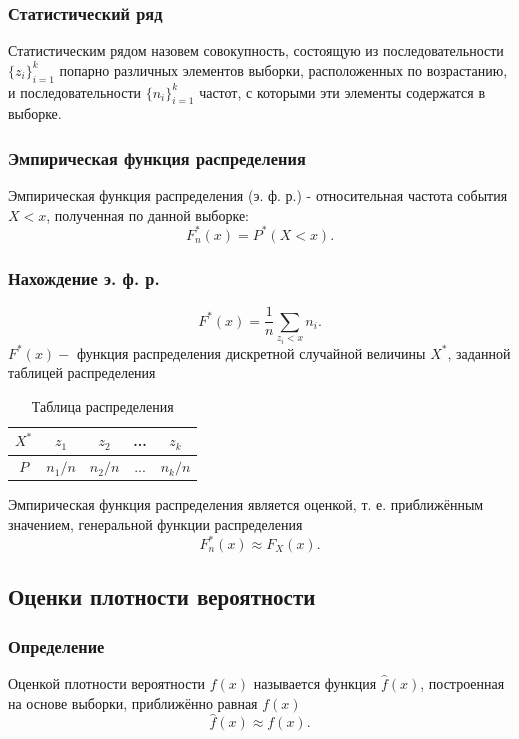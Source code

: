 \documentclass[a4paper]{article}
\begin{document}
\subsubsection{Статистический ряд}
Статистическим рядом назовем совокупность, состоящую из последовательности $\displaystyle\{z_i\}_{i=1}^k$ попарно различных элементов выборки, расположенных по возрастанию, и последовательности $\displaystyle\{n_i\}_{i=1}^k$ частот, с которыми эти элементы содержатся в выборке.
\subsubsection{Эмпирическая функция распределения}
Эмпирическая функция распределения (э. ф. р.) - относительная частота события $X < x$, полученная по данной выборке:
\begin{equation}
    F_n^*(x)=P^*(X<x).
\end{equation}
\subsubsection{Нахождение э. ф. р.}
\begin{equation}
    F^*(x)=\frac{1}{n}\sum_{z_i<x}n_i.
\end{equation}
$F^*(x)-$ функция распределения дискретной случайной величины $X^*$, заданной таблицей распределения
\begin{table}[H]
    \centering
    \begin{tabular}{|c|c|c|c|c|}
        \hline
         $X^*$&$z_1$&$z_2$&...&$z_k$\\
         \hline
         $P$&$n_1/n$&$n_2/n$&...&$n_k/n$\\
         \hline
    \end{tabular}
    \caption{Таблица распределения}
    \label{tab:my_label}
\end{table}
Эмпирическая функция распределения является оценкой, т. е. приближённым значением, генеральной функции распределения
\begin{equation}
    F_n^*(x)\approx F_X(x).
\end{equation}
\subsection{Оценки плотности вероятности}
\subsubsection{Определение}
Оценкой плотности вероятности $f(x)$ называется функция $\widehat{f}(x)$, построенная на основе выборки, приближённо равная $f(x)$
\begin{equation}
    \widehat{f}(x)\approx f(x).
\end{equation}
\end{document}
